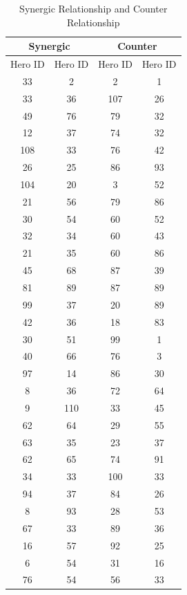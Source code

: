 \begin{table}[!tb] 
\footnotesize
\centering \caption{Synergic Relationship and Counter Relationship}
\label{table:pairs} 
\begin{tabular} {|c|c|c|c|} 
\hline \multicolumn{2}{|c|}{Synergic} & \multicolumn{2}{|c|}{Counter}
\\ \hline Hero ID & Hero ID & Hero ID & Hero ID
\\ \hline 33&2&2&1
\\ \hline 33&36&107&26
\\ \hline 49&76&79&32
\\ \hline 12&37&74&32
\\ \hline 108&33&76&42
\\ \hline 26&25&86&93
\\ \hline 104&20&3&52
\\ \hline 21&56&79&86
\\ \hline 30&54&60&52
\\ \hline 32&34&60&43
\\ \hline 21&35&60&86
\\ \hline 45&68&87&39
\\ \hline 81&89&87&89
\\ \hline 99&37&20&89
\\ \hline 42&36&18&83
\\ \hline 30&51&99&1
\\ \hline 40&66&76&3
\\ \hline 97&14&86&30
\\ \hline 8&36&72&64
\\ \hline 9&110&33&45
\\ \hline 62&64&29&55
\\ \hline 63&35&23&37
\\ \hline 62&65&74&91
\\ \hline 34&33&100&33
\\ \hline 94&37&84&26
\\ \hline 8&93&28&53
\\ \hline 67&33&89&36
\\ \hline 16&57&92&25
\\ \hline 6&54&31&16
\\ \hline 76&54&56&33
\\ \hline
\end{tabular}
\end{table}


